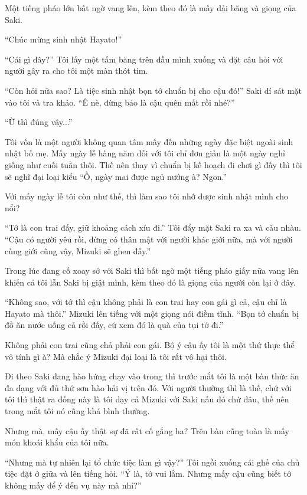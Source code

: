 {Một tiếng pháo lớn bất ngờ vang lên, kèm theo đó là mấy dải băng và
giọng của Saki.

``Chúc mừng sinh nhật Hayato!''

``Cái gì đây?'' Tôi lấy một tấm băng trên đầu mình xuống và đặt câu hỏi
với người gây ra cho tôi một màn thót tim.

``Còn hỏi nữa sao? Là tiệc sinh nhật bọn tớ chuẩn bị cho cậu đó!'' Saki
dí sát mặt vào tôi và tra khảo. ``Ê nè, đừng bảo là cậu quên mất rồi
nhé?''

``Ừ thì đúng vậy...''

Tôi vốn là một người không quan tâm mấy đến những ngày đặc biệt ngoài
sinh nhật bố mẹ. Mấy ngày lễ hàng năm đối với tôi chỉ đơn giản là một
ngày nghỉ giống như cuối tuần thôi. Thế nên thay vì chuẩn bị kế hoạch đi
chơi gì đấy thì tôi sẽ nghĩ đại loại kiểu ``Ồ, ngày mai được ngủ nướng
à? Ngon.''

Với mấy ngày lễ tôi còn như thế, thì làm sao tôi nhớ được sinh nhật mình
cho nổi?

``Tớ là con trai đấy, giữ khoảng cách xíu đi.'' Tôi đẩy mặt Saki ra xa
và càu nhàu. ``Cậu có người yêu rồi, đừng có thân mật với người khác
giới nữa, mà với người cùng giới cũng vậy, Mizuki sẽ ghen đấy.''

Trong lúc đang cố xoay sở với Saki thì bất ngờ một tiếng pháo giấy nữa
vang lên khiến cả tôi lẫn Saki bị giật mình, kèm theo đó là giọng của
người còn lại ở đây.

``Không sao, với tớ thì cậu không phải là con trai hay con gái gì cả,
cậu chỉ là Hayato mà thôi.'' Mizuki lên tiếng với một giọng nói điềm
tĩnh. ``Bọn tớ chuẩn bị đồ ăn nước uống cả rồi đấy, cứ xem đó là quà của
tụi tớ đi.''

Không phải con trai cũng chả phải con gái. Bộ ý cậu ấy tôi là một thứ
thực thể vô tính gì à? Mà chắc ý Mizuki đại loại là tôi rất vô hại thôi.

Đi theo Saki đang hào hứng chạy vào trong thì trước mắt tôi là một bàn
thức ăn đa dạng với đủ thứ sơn hào hải vị trên đó. Với người thường thì
là thế, chứ với tôi thì thật ra đống này là tôi dạy cả Mizuki với Saki
nấu đó chứ đâu, thế nên trong mắt tôi nó cũng khá bình thường.

Nhưng mà, mấy cậu ấy thật sự đã rất cố gắng ha? Trên bàn cũng toàn là
mấy món khoái khẩu của tôi nữa.

``Nhưng mà tự nhiên lại tổ chức tiệc làm gì vậy?'' Tôi ngồi xuống cái
ghế của chủ tiệc đặt ở giữa và lên tiếng hỏi. ``Ý là, tớ vui lắm. Nhưng
mấy cậu cũng biết tớ không mấy để ý đến vụ này mà nhỉ?''

}
